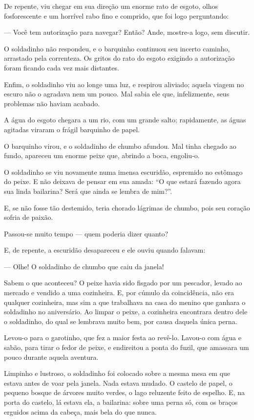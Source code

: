 \begin{myquote}
De repente, viu chegar em sua direção um enorme rato de esgoto, olhos
fosforescente e um horrível rabo fino e comprido, que foi logo
perguntando:

--- Você tem autorização para navegar? Então? Ande, mostre-a logo, sem
discutir.

O soldadinho não respondeu, e o barquinho continuou seu incerto caminho,
arrastado pela correnteza. Os gritos do rato do esgoto exigindo a
autorização foram ficando cada vez mais distantes.

Enfim, o soldadinho viu ao longe uma luz, e respirou aliviado; aquela
viagem no escuro não o agradava nem um pouco. Mal sabia ele que,
infelizmente, seus problemas não haviam acabado.

A água do esgoto chegara a um rio, com um grande salto; rapidamente, as
águas agitadas viraram o frágil barquinho de papel.

O barquinho virou, e o soldadinho de chumbo afundou. Mal tinha chegado
ao fundo, apareceu um enorme peixe que, abrindo a boca, engoliu-o.

O soldadinho se viu novamente numa imensa escuridão, espremido no
estômago do peixe. E não deixava de pensar em sua amada: ``O que estará
fazendo agora sua linda bailarina? Será que ainda se lembra de mim?''.

E, se não fosse tão destemido, teria chorado lágrimas de chumbo, pois
seu coração sofria de paixão.

Passou-se muito tempo --- quem poderia dizer quanto?

E, de repente, a escuridão desapareceu e ele ouviu quando falavam:

--- Olhe! O soldadinho de chumbo que caiu da janela!

Sabem o que aconteceu? O peixe havia sido fisgado por um pescador,
levado ao mercado e vendido a uma cozinheira. E, por cúmulo da
coincidência, não era qualquer cozinheira, mas sim a que trabalhava na
casa do menino que ganhara o soldadinho no aniversário. Ao limpar o
peixe, a cozinheira encontrara dentro dele o soldadinho, do qual se
lembrava muito bem, por causa daquela única perna.

Levou-o para o garotinho, que fez a maior festa ao revê-lo. Lavou-o com
água e sabão, para tirar o fedor de peixe, e endireitou a ponta do
fuzil, que amassara um pouco durante aquela aventura.

Limpinho e lustroso, o soldadinho foi colocado sobre a mesma mesa em que
estava antes de voar pela janela. Nada estava mudado. O castelo de
papel, o pequeno bosque de árvores muito verdes, o lago reluzente feito
de espelho. E, na porta do castelo, lá estava ela, a bailarina: sobre
uma perna só, com os braços erguidos acima da cabeça, mais bela do que
nunca.


\end{myquote}
